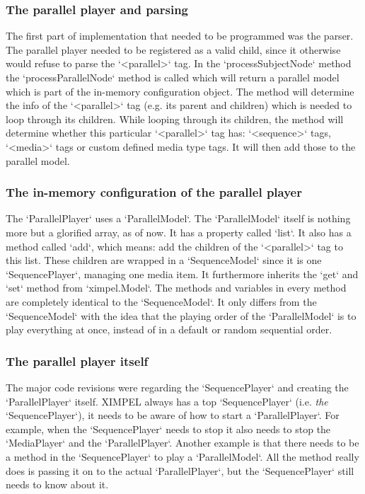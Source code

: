 \subsubsection{The parallel player and parsing}
The first part of implementation that needed to be programmed was the parser. The parallel player needed to be registered as a valid child, since it otherwise would refuse to parse the `<parallel>` tag. In the `processSubjectNode` method the `processParallelNode` method is called which will return a parallel model which is part of the in-memory configuration object. The method will determine the info of the `<parallel>` tag (e.g. its parent and children) which is needed to loop through its children. While looping through its children, the method will determine whether this particular `<parallel>` tag has: `<sequence>` tags, `<media>` tags or custom defined media type tags. It will then add those to the parallel model.

\subsubsection{The in-memory configuration of the parallel player}
The `ParallelPlayer` uses a `ParallelModel`. The `ParallelModel` itself is nothing more but a glorified array, as of now. It has a property called `list`. It also has a method called `add`, which means: add the children of the `<parallel>` tag to this list. These children are wrapped in a `SequenceModel` since it is one `SequencePlayer`, managing one media item. It furthermore inherits the `get` and `set` method from `ximpel.Model`. The methods and variables in every method are completely identical to the `SequenceModel`. It only differs from the `SequenceModel` with the idea that the playing order of the `ParallelModel` is to play everything at once, instead of in a default or random sequential order. 

\subsubsection{The parallel player itself}
The major code revisions were regarding the `SequencePlayer` and creating the `ParallelPlayer` itself. XIMPEL always has a top `SequencePlayer` (i.e. \textit{the} `SequencePlayer`), it needs to be aware of how to start a `ParallelPlayer`. For example, when the `SequencePlayer` needs to stop it also needs to stop the `MediaPlayer` and the `ParallelPlayer`. Another example is that there needs to be a method in the `SequencePlayer` to play a `ParallelModel`. All the method really does is passing it on to the actual `ParallelPlayer`, but the `SequencePlayer` still needs to know about it.

